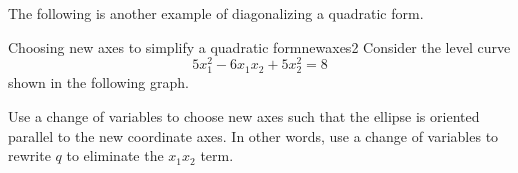 The following is another example of diagonalizing a quadratic form. 

\begin{example}{Choosing new axes to simplify a quadratic form}{newaxes2}
Consider the level curve
\begin{equation*}
5x_1^{2}-6x_1x_2+5x_2^{2}=8
\end{equation*} 
shown in the following graph. 

\begin{center}
\end{center}

Use a change of variables to choose new axes such that the ellipse is oriented parallel to the new coordinate axes. In other words, use a change of variables to rewrite $q$ to eliminate the $x_1x_2$ term. 
\end{example}

